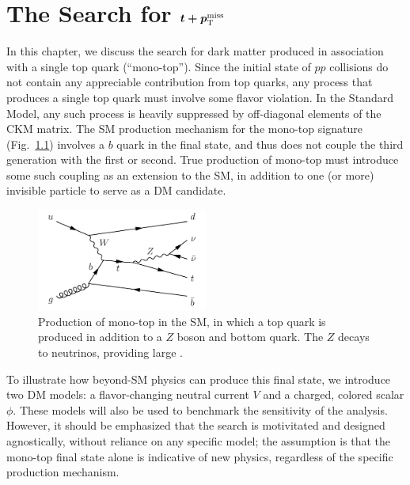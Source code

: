 \chapter{The Search for $\boldmath{t+p_\text{T}^\text{miss}}$}

In this chapter, we discuss the search for dark matter produced in association with a single top quark (``mono-top'').
Since the initial state of $pp$ collisions do not contain any appreciable contribution from top quarks, any process that produces a single top quark must involve some flavor violation.
In the Standard Model, any such process is heavily suppressed by off-diagonal elements of the CKM matrix.
The SM production mechanism for the mono-top signature (Fig.~\ref{fig:tzq}) involves a $b$ quark in the final state, and thus does not couple the third generation with the first or second.
True production of mono-top must introduce some such coupling as an extension to the SM, in addition to one (or more) invisible particle to serve as a DM candidate.

\begin{figure}
    \begin{center}
        \includegraphics[width=0.5\textwidth]{figures/monotop/diagrams/tzq.pdf}
        \caption{Production of mono-top in the SM, in which a top quark is produced in addition to a $Z$ boson and bottom quark. The $Z$ decays to neutrinos, providing large \ptmiss.}
        \label{fig:tzq}
    \end{center}
\end{figure}

To illustrate how beyond-SM physics can produce this final state, we introduce two DM models: a flavor-changing neutral current $V$ and a charged, colored scalar $\phi$.
These models will also be used to benchmark the sensitivity of the analysis.
However, it should be emphasized that the search is motivitated and designed agnostically, without reliance on any specific model; the assumption is that the mono-top final state alone is indicative of new physics, regardless of the specific production mechanism.

